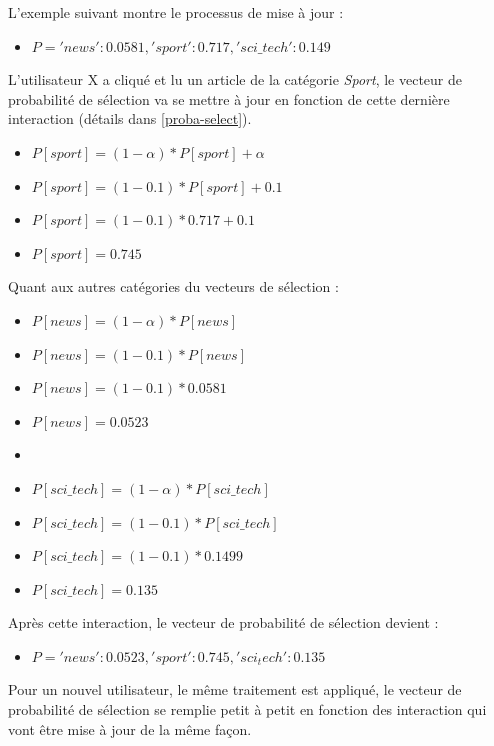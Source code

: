         L'exemple suivant montre le processus de mise à jour :
        \begin{itemize}[label={}]
            \item $P = {'news': 0.0581,'sport': 0.717, 'sci\_tech': 0.149}$\\
        \end{itemize}

        L'utilisateur X a cliqué et lu un article de la catégorie \emph{Sport}, le vecteur de probabilité de sélection va se mettre à jour en fonction de cette dernière interaction (détails dans \ref{proba-select}).
        \begin{itemize}[label={}]
            \item $P[sport] = (1-{\alpha}) * {P[sport]} + {\alpha}$
            \item $P[sport] = (1-{0.1}) * {P[sport]} + {0.1}$
            \item $P[sport] = (1-{0.1}) * {0.717} + {0.1}$
            \item $P[sport] = 0.745$
        \end{itemize}

        Quant aux autres catégories du vecteurs de sélection :
        \begin{itemize}[label={}]
            \item $P[news] = (1-{\alpha}) * {P[news]} $
            \item $P[news] = (1-{0.1}) * {P[news]} $
            \item $P[news] = (1-{0.1}) * {0.0581} $
            \item $P[news] = 0.0523$
            \item 
            \item $P[sci\_tech] = (1-{\alpha}) * {P[sci\_tech]} $
            \item $P[sci\_tech] = (1-{0.1}) * {P[sci\_tech]} $
            \item $P[sci\_tech] = (1-{0.1}) * {0.1499} $
            \item $P[sci\_tech] = 0.135$
        \end{itemize}
        Après cette interaction, le vecteur de probabilité de sélection devient :
        \begin{itemize}[label={}]
            \item $P = {'news': 0.0523, 'sport': 0.745, 'sci_tech': 0.135}$\\
        \end{itemize}
        Pour un nouvel utilisateur, le même traitement est appliqué, le vecteur de probabilité de sélection se remplie petit à petit en fonction des interaction qui vont être mise à jour de la même façon.
